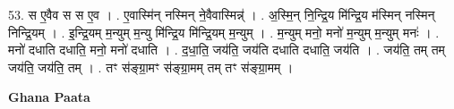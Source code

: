 \documentclass[17pt]{extarticle}
\begin{document}
53. स ए॒वैव स स ए॒व । . ए॒वास्मि॑न् नस्मिन् ने॒वैवास्मिन्न्॑ । . अ॒स्मि॒न् नि॒न्द्रि॒य मि॑न्द्रि॒य म॑स्मिन् नस्मिन् निन्द्रि॒यम् । . इ॒न्द्रि॒यम् म॒न्युम् म॒न्यु मि॑न्द्रि॒य मि॑न्द्रि॒यम् म॒न्युम् । . म॒न्युम् मनो॒ मनो॑ म॒न्युम् म॒न्युम् मनः॑ । . मनो॑ दधाति दधाति॒ मनो॒ मनो॑ दधाति । . द॒धा॒ति॒ जय॑ति॒ जय॑ति दधाति दधाति॒ जय॑ति । . जय॑ति॒ तम् तम् जय॑ति॒ जय॑ति॒ तम् । . तꣳ स॑ङ्ग्रा॒मꣳ स॑ङ्ग्रा॒मम् तम् तꣳ स॑ङ्ग्रा॒मम् । \newline

\textbf{Ghana Paata } \newline
\end{document}

